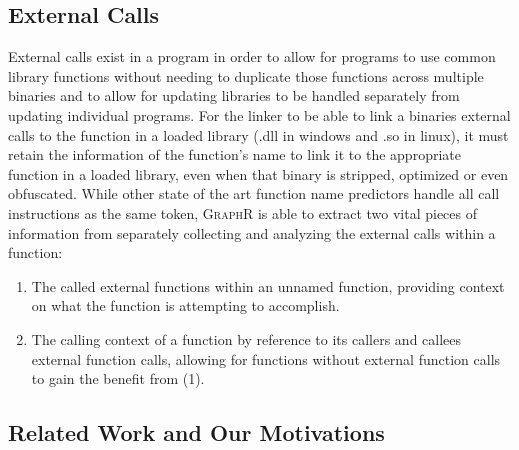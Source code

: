 \documentclass[sigconf,nonacm]{acmart}
\newcommand{\sysname}{\textsc{GraphR}}
\begin{document}
\subsection{External Calls}
\label{sec:external}
External calls exist in a program in order to allow for programs to use common library functions without needing to duplicate those functions across multiple binaries and to allow for updating libraries to be handled separately from updating individual programs. For the linker to be able to link a binaries external calls to the function in a loaded library (.dll in windows and .so in linux), it must retain the information of the function's name to link it to the appropriate function in a loaded library, even when that binary is stripped, optimized or even obfuscated. While other state of the art function name predictors handle all call instructions as the same token, \sysname{} is able to extract two vital pieces of information from separately collecting and analyzing the external calls within a function:

\begin{enumerate}
    \item The called external functions within an unnamed function, providing context on what the function is attempting to accomplish. %
    \item The calling context of a function by reference to its callers and callees external function calls, allowing for functions without external function calls to gain the benefit from (1).
\end{enumerate}

\subsection{Related Work and Our Motivations}
\label{sec:related}
\end{document}
